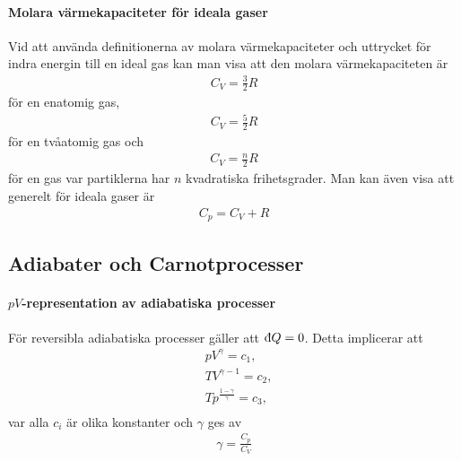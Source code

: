 \paragraph{Molara värmekapaciteter för ideala gaser}
Vid att använda definitionerna av molara värmekapaciteter och uttrycket för indra energin till en ideal gas kan man visa att den molara värmekapaciteten är
\begin{align*}
	C_V = \frac{3}{2}R
\end{align*}
för en enatomig gas,
\begin{align*}
	C_V = \frac{5}{2}R
\end{align*}
för en tvåatomig gas och
\begin{align*}
	C_V = \frac{n}{2}R
\end{align*}
för en gas var partiklerna har $n$ kvadratiska frihetsgrader. Man kan även visa att generelt för ideala gaser är
\begin{align*}
	C_p = C_V + R
\end{align*}

\subsection{Adiabater och Carnotprocesser}

\paragraph{$pV$-representation av adiabatiska processer}
För reversibla adiabatiska processer gäller att $\idd{Q} = 0$. Detta implicerar att
\begin{align*}
	& pV^\gamma = c_1, \\
	& TV^{\gamma - 1} = c_2, \\
	& Tp^{\frac{1-\gamma}{\gamma}} = c_3, \\
\end{align*}
var alla $c_i$ är olika konstanter och $\gamma$ ges av
\begin{align*}
	\gamma = \frac{C_p}{C_V}
\end{align*}

